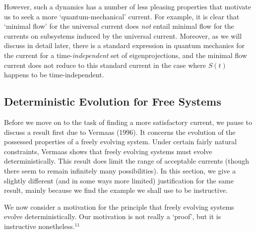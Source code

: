 \documentclass[12pt]{article}
\begin{document}
However, such a dynamics has a number of less pleasing properties that 
motivate us to seek a more `quantum-mechanical' current.  For example, 
it is clear that `minimal flow' for the universal current does {\it 
not} entail minimal flow for the currents on subsystems induced by the 
universal current.  Moreover, as we will discuss in detail later, 
there is a standard expression in quantum mechanics for the current 
for a time-{\it independent} set of eigenprojections, and the minimal 
flow current does not reduce to this standard current in the case 
where $S(t)$ happens to be time-independent.



\subsection{Deterministic Evolution for Free Systems}


Before we move on to the task of finding a more satisfactory current, 
we pause to discuss a result first due to Vermaas (1996).  It concerns 
the evolution of the possessed properties of a freely evolving system.  
Under certain fairly natural constraints, Vermaas shows that freely 
evolving systems must evolve deterministically.  This result does 
limit the range of acceptable currents (though there seem to remain 
infinitely many possibilities).  In this section, we give a slightly 
different (and in some ways more limited) justification for the same 
result, mainly because we find the example we shall use to be 
instructive.

We now consider a motivation for the principle that freely evolving 
systems evolve deterministically.  Our motivation is not really a 
`proof', but it is instructive nonetheless.$^{11}$
\end{document}
